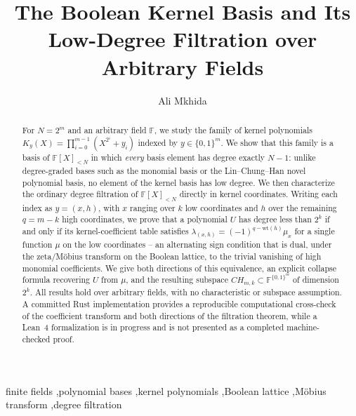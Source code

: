 \documentclass[preprint,3p,12pt,numbers]{elsarticle}
\theoremstyle{definition}
\theoremstyle{remark}
\newcommand{\wt}{\mathrm{wt}}
\begin{document}
\begin{frontmatter}

\title{The Boolean Kernel Basis and Its Low-Degree Filtration over Arbitrary Fields}
\author[algorizk]{Ali Mkhida}

\address[algorizk]{Algorizk Labs}

\begin{abstract}
For $N = 2^m$ and an arbitrary field $\mathbb{F}$, we study the family of
kernel polynomials $K_y(X) = \prod_{i=0}^{m-1}\left(X^{2^i}+y_i\right)$
indexed by $y \in \{0,1\}^m$. We show that this family is a basis of
$\mathbb{F}[X]_{<N}$ in which \emph{every} basis element has degree exactly
$N-1$: unlike degree-graded bases such as the monomial basis or the
Lin--Chung--Han novel polynomial basis, no element of the kernel basis has
low degree. We then characterize the ordinary degree filtration of
$\mathbb{F}[X]_{<N}$ directly in kernel coordinates. Writing each index as
$y = (x,h)$, with $x$ ranging over $k$ low coordinates and $h$ over the
remaining $q = m-k$ high coordinates, we prove that a polynomial $U$ has
degree less than $2^k$ if and only if its kernel-coefficient table
satisfies $\lambda_{(x,h)} = (-1)^{q-\wt(h)}\mu_x$ for a single function
$\mu$ on the low coordinates -- an alternating sign condition that is dual,
under the zeta/M\"obius transform on the Boolean lattice, to the trivial
vanishing of high monomial coefficients. We give both directions of this
equivalence, an explicit collapse formula recovering $U$ from $\mu$, and the
resulting subspace $CH_{m,k} \subset \mathbb{F}^{\{0,1\}^m}$ of dimension
$2^k$. All results hold over arbitrary fields, with no characteristic or
subspace assumption. A committed Rust implementation provides a reproducible computational cross-check of the coefficient transform and both directions of the filtration theorem, while a Lean~4 formalization is in progress and is not presented as a completed machine-checked proof.
\end{abstract}

\begin{keyword}
finite fields \sep polynomial bases \sep kernel polynomials \sep Boolean lattice \sep M\"obius transform \sep degree filtration
\end{keyword}

\end{frontmatter}
\end{document}

